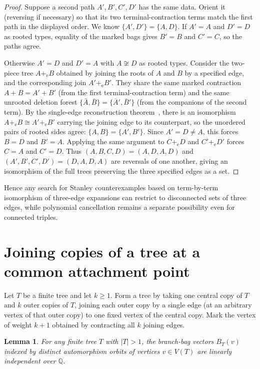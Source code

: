 \documentclass[10pt]{article}
\newtheorem{lemma}[theorem]{Lemma}
\begin{document}
\begin{proof}
Suppose a second path $A',B',C',D'$ has the same data. Orient it (reversing if necessary) so that its two terminal-contraction terms match the first path in the displayed order. We know $\{A',D'\}=\{A,D\}$. If $A'=A$ and $D'=D$ as rooted types, equality of the marked bags gives $B'=B$ and $C'=C$, so the paths agree.

Otherwise $A'=D$ and $D'=A$ with $A\not\cong D$ as rooted types. Consider the two-piece tree $A+_{\mathrm{e}} B$ obtained by joining the roots of $A$ and $B$ by a specified edge, and the corresponding join $A'+_{\mathrm{e}} B'$. They share the same marked contraction $A+B=A'+B'$ (from the first terminal-contraction term) and the same unrooted deletion forest $\{\bar A,\bar B\}=\{\bar A',\bar B'\}$ (from the companions of the second term). By the single-edge reconstruction theorem~\cite{single-edge}, there is an isomorphism $A+_{\mathrm{e}} B\cong A'+_{\mathrm{e}} B'$ carrying the joining edge to its counterpart, so the unordered pairs of rooted sides agree: $\{A,B\}=\{A',B'\}$. Since $A'=D\neq A$, this forces $B=D$ and $B'=A$. Applying the same argument to $C+_{\mathrm{e}} D$ and $C'+_{\mathrm{e}} D'$ forces $C=A$ and $C'=D$. Thus $(A,B,C,D)=(A,D,A,D)$ and $(A',B',C',D')=(D,A,D,A)$ are reversals of one another, giving an isomorphism of the full trees preserving the three specified edges as a set.
\end{proof}

Hence any search for Stanley counterexamples based on term-by-term isomorphism of three-edge expansions can restrict to disconnected sets of three edges, while polynomial cancellation remains a separate possibility even for connected triples.

\section{Joining copies of a tree at a common attachment point}

Let $T$ be a finite tree and let $k\ge 1$. Form a tree by taking one central copy of $T$ and $k$ outer copies of $T$, joining each outer copy by a single edge (at an arbitrary vertex of that outer copy) to one fixed vertex of the central copy. Mark the vertex of weight $k+1$ obtained by contracting all $k$ joining edges.

\begin{lemma}\label{lem:branch-indep}
For any finite tree $T$ with $|T|>1$, the branch-bag vectors $B_T(v)$ indexed by distinct automorphism orbits of vertices $v\in V(T)$ are linearly independent over $\mathbb{Q}$.
\end{lemma}
\end{document}
